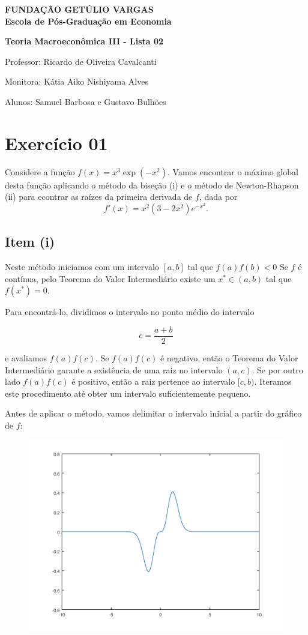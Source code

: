 \documentclass{article}
\begin{document}
\begin{flushleft}
\textbf{FUNDAÇÃO GETÚLIO VARGAS} \\

\textbf{Escola de Pós-Graduação em Economia}

\textbf{Teoria Macroeconômica III - Lista 02}

Professor: Ricardo de Oliveira Cavalcanti

Monitora: Kátia Aiko Nishiyama Alves

Alunos: Samuel Barbosa e Gustavo Bulhões
\end{flushleft}

\section*{Exercício 01}
Considere a função $f(x) = x^3 \exp(-x^2)$. Vamos encontrar o máximo global desta função
aplicando o método da biseção (i) e o método de Newton-Rhapson (ii) para econtrar 
as raízes da primeira derivada de $f$, dada por $$f'(x) = x^2 (3-2x^2) e^{-x^2}.$$

\subsection*{Item (i)}

Neste método iniciamos com um intervalo $[a,b]$
tal que $f(a) f(b) < 0$ Se $f$ é contínua, pelo Teorema do Valor Intermediário 
existe um $x^* \in (a,b)$ tal que $f(x^*) = 0$.

Para encontrá-lo, dividimos o intervalo no ponto médio do intervalo

$$ c = \frac{a + b}{2}$$

e avaliamos $f(a) f(c)$. Se $f(a) f(c)$ é negativo, então o 
Teorema do Valor Intermediário garante a existência de uma raiz no intervalo
$(a,c)$. Se por outro lado $f(a) f(c)$ é positivo, então a raiz pertence ao intervalo
$[c,b)$. Iteramos este procedimento até obter um intervalo suficientemente pequeno.

Antes de aplicar o método, vamos delimitar o intervalo inicial a partir do gráfico de $f$:

\begin{figure}[!h]
  \includegraphics[scale=0.6]{ex1/ex1_1.png}
\end{figure}
\end{document}
